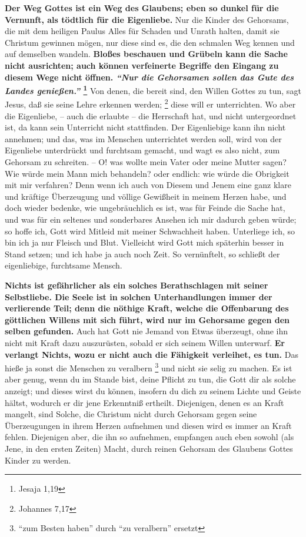 \textbf{Der Weg Gottes ist ein Weg des Glaubens; eben so dunkel für die
Vernunft,  als
tödtlich für die Eigenliebe.} Nur die Kinder des Gehorsams,  die mit dem heiligen
Paulus Alles für Schaden und Unrath halten, damit sie Christum gewinnen mögen,
nur diese sind es, die den schmalen Weg kennen und auf demselben wandeln.
\textbf{Bloßes
beschauen und Grübeln kann die Sache nicht ausrichten; auch können verfeinerte
Begriffe den Eingang zu diesem Wege nicht öffnen.
\textit{"`Nur die Gehorsamen sollen das Gute des Landes genießen."'}
\footnote{Jesaja 1,19}}
Von denen, die bereit sind,
den Willen Gottes zu tun, sagt Jesus, daß sie seine Lehre erkennen
werden;
\footnote{Johannes 7,17}
diese will er unterrichten. Wo aber die Eigenliebe,
-- auch die erlaubte -- die Herrschaft hat, und nicht untergeordnet ist, da kann
sein Unterricht nicht stattfinden. Der Eigenliebige kann ihn nicht annehmen; und
das, was im Menschen unterrichtet werden soll, wird von der Eigenliebe
unterdrückt und furchtsam gemacht, und wagt es also nicht, zum Gehorsam zu
schreiten. -- O! was wollte mein Vater oder meine Mutter sagen? Wie würde mein
Mann mich behandeln? oder endlich: wie würde die Obrigkeit mit mir verfahren?
Denn wenn ich auch von Diesem und Jenem eine ganz klare und kräftige
Überzeugung und völlige Gewißheit in meinem Herzen habe, und doch wieder
bedenke, wie ungebräuchlich es ist, was für Feinde die Sache hat, und was für
ein seltenes und sonderbares Ansehen ich mir dadurch geben würde; so hoffe ich,
Gott wird Mitleid mit meiner Schwachheit haben. Unterliege ich, so bin ich ja
nur Fleisch und Blut. Vielleicht wird Gott mich späterhin besser in Stand
setzen; und ich habe ja auch noch Zeit. So vernünftelt, so schließt der
eigenliebige, furchtsame Mensch.

\medskip

\textbf{Nichts ist gefährlicher als ein solches Berathschlagen mit seiner Selbstliebe.
Die Seele ist in solchen Unterhandlungen immer der verlierende Teil;
denn die
nöthige Kraft, welche die Offenbarung des göttlichen Willens mit sich führt,
wird nur im Gehorsame gegen den selben gefunden.} Auch hat Gott nie Jemand von
Etwas überzeugt, ohne ihn nicht mit Kraft dazu auszurüsten, sobald er sich
seinem Willen unterwarf. \textbf{Er verlangt Nichts, wozu er nicht auch die
Fähigkeit
verleihet, es tun.} Das hieße ja sonst die Menschen zu veralbern \footnote{"`zum Besten haben"' durch "`zu veralbern"' ersetzt} und nicht sie
selig zu machen. Es ist aber genug, wenn du im Stande bist, deine Pflicht zu
tun, die Gott dir als solche anzeigt; und dieses wirst du können, insofern du
dich zu seinem Lichte und Geiste hältst, wodurch er dir jene Erkenntniß
ertheilt. Diejenigen, denen es an Kraft mangelt, sind Solche, die Christum nicht
durch Gehorsam gegen seine Überzeugungen in ihrem Herzen aufnehmen und diesen
wird es immer an Kraft fehlen. Diejenigen aber, die ihn so aufnehmen, empfangen
auch eben sowohl (als Jene, in den ersten Zeiten) Macht, durch reinen Gehorsam
des Glaubens Gottes Kinder zu werden.

